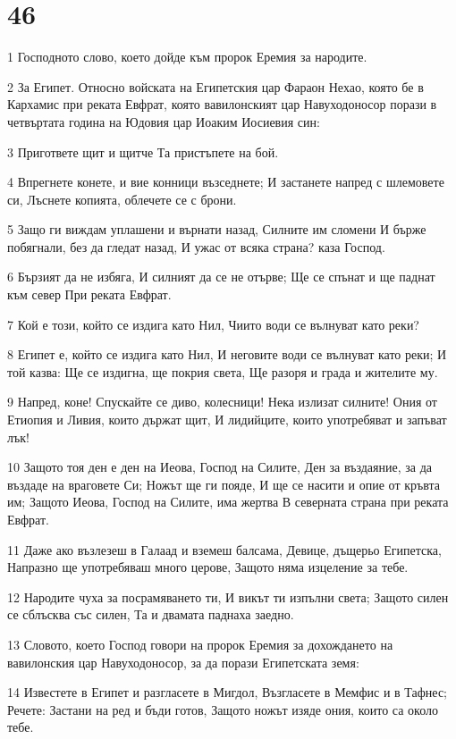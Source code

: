 \chapter{46}

\par 1 Господното слово, което дойде към пророк Еремия за народите.
\par 2 За Египет. Относно войската на Египетския цар Фараон Нехао, която бе в Кархамис при реката Евфрат, която вавилонският цар Навуходоносор порази в четвъртата година на Юдовия цар Иоаким Иосиевия син:
\par 3 Пригответе щит и щитче Та пристъпете на бой.
\par 4 Впрегнете конете, и вие конници възседнете; И застанете напред с шлемовете си, Лъснете копията, облечете се с брони.
\par 5 Защо ги виждам уплашени и върнати назад, Силните им сломени И бърже побягнали, без да гледат назад, И ужас от всяка страна? каза Господ.
\par 6 Бързият да не избяга, И силният да се не отърве; Ще се спънат и ще паднат към север При реката Евфрат.
\par 7 Кой е този, който се издига като Нил, Чиито води се вълнуват като реки?
\par 8 Египет е, който се издига като Нил, И неговите води се вълнуват като реки; И той казва: Ще се издигна, ще покрия света, Ще разоря и града и жителите му.
\par 9 Напред, коне! Спускайте се диво, колесници! Нека излизат силните! Ония от Етиопия и Ливия, които държат щит, И лидийците, които употребяват и запъват лък!
\par 10 Защото тоя ден е ден на Иеова, Господ на Силите, Ден за въздаяние, за да въздаде на враговете Си; Ножът ще ги пояде, И ще се насити и опие от кръвта им; Защото Иеова, Господ на Силите, има жертва В северната страна при реката Евфрат.
\par 11 Даже ако възлезеш в Галаад и вземеш балсама, Девице, дъщерьо Египетска, Напразно ще употребяваш много церове, Защото няма изцеление за тебе.
\par 12 Народите чуха за посрамяването ти, И викът ти изпълни света; Защото силен се сблъсква със силен, Та и двамата паднаха заедно.
\par 13 Словото, което Господ говори на пророк Еремия за дохождането на вавилонския цар Навуходоносор, за да порази Египетската земя:
\par 14 Известете в Египет и разгласете в Мигдол, Възгласете в Мемфис и в Тафнес; Речете: Застани на ред и бъди готов, Защото ножът изяде ония, които са около тебе.
